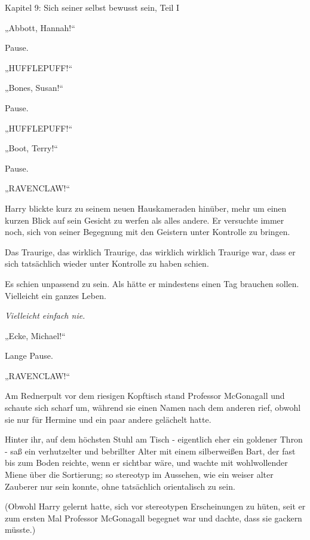 

\hypertarget{sich-seiner-selbst-bewusst-sein-teil-1}{%

Kapitel 9: Sich seiner selbst bewusst sein, Teil I

„Abbott, Hannah!“

Pause.

„HUFFLEPUFF!“

„Bones, Susan!“

Pause.

„HUFFLEPUFF!“

„Boot, Terry!“

Pause.

„RAVENCLAW!“

Harry blickte kurz zu seinem neuen Hauskameraden hinüber, mehr um einen kurzen Blick auf sein Gesicht zu werfen als alles andere. Er versuchte immer noch, sich von seiner Begegnung mit den Geistern unter Kontrolle zu bringen.

Das Traurige, das wirklich Traurige, das wirklich wirklich Traurige war, dass er sich tatsächlich wieder unter Kontrolle zu haben schien.

Es schien unpassend zu sein. Als hätte er mindestens einen Tag brauchen sollen. Vielleicht ein ganzes Leben.

\emph{Vielleicht einfach nie.}

„Ecke, Michael!“

Lange Pause.

„RAVENCLAW!“

Am Rednerpult vor dem riesigen Kopftisch stand Professor McGonagall und schaute sich scharf um, während sie einen Namen nach dem anderen rief, obwohl sie nur für Hermine und ein paar andere gelächelt hatte.

Hinter ihr, auf dem höchsten Stuhl am Tisch - eigentlich eher ein goldener Thron - saß ein verhutzelter und bebrillter Alter mit einem silberweißen Bart, der fast bis zum Boden reichte, wenn er sichtbar wäre, und wachte mit wohlwollender Miene über die Sortierung; so stereotyp im Aussehen, wie ein weiser alter Zauberer nur sein konnte, ohne tatsächlich orientalisch zu sein.

(Obwohl Harry gelernt hatte, sich vor stereotypen Erscheinungen zu hüten, seit er zum ersten Mal Professor McGonagall begegnet war und dachte, dass sie gackern müsste.)

}
